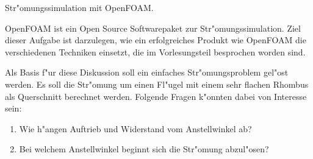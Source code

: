 \begin{aufgabe}
Str"omungssimulation mit OpenFOAM.
\end{aufgabe}

OpenFOAM ist ein Open Source Softwarepaket zur Str"omungssimulation.
Ziel dieser Aufgabe ist darzulegen, wie ein erfolgreiches Produkt
wie OpenFOAM die verschiedenen Techniken einsetzt, die im 
Vorlesungsteil besprochen worden sind.

Als Basis f"ur diese Diskussion soll ein einfaches Str"omungsproblem
gel"ost werden.
Es soll die Str"omung um einen Fl"ugel mit einem sehr flachen Rhombus
als Querschnitt berechnet werden. 
Folgende Fragen k"onnten dabei von Interesse sein:
\begin{enumerate}
\item Wie h"angen Auftrieb und Widerstand vom Anstellwinkel ab?
\item Bei welchem Anstellwinkel beginnt sich die Str"omung abzul"osen?
\end{enumerate}

